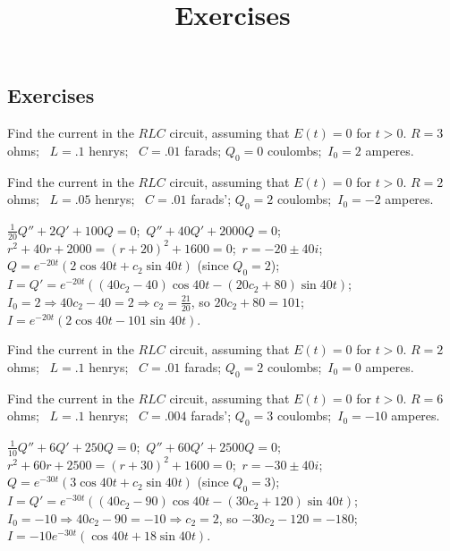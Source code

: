 \documentclass{ximera}
\title{Exercises} \license{CC BY-NC-SA 4.0}
\begin{document}
\begin{abstract}
\end{abstract}
\maketitle

\begin{onlineOnly}
\section*{Exercises}
\end{onlineOnly}


\begin{problem}\label{exer:6.3.1}
Find the current in the
$RLC$ circuit, assuming that $E(t)=0$ for $t>0$.  $R=3$ ohms;  \, $L=.1$ henrys;  \, $C=.01$ farads;   $Q_0=0$
coulombs;  \,$I_0=2$ amperes.
\end{problem}

\begin{problem}\label{exer:6.3.2}
Find the current in the
$RLC$ circuit, assuming that $E(t)=0$ for $t>0$.  $R=2$ ohms;  \, $L=.05$ henrys;  \, $C=.01$ farads';  $Q_0=2$
coulombs;  \,$I_0=-2$ amperes.

\begin{solution}
    $\frac{1}{20}Q''+2Q'+100Q=0$;\, $Q''+40Q'+2000Q=0$;\,
$r^2+40r+2000=(r+20)^2+1600=0$;\,
$r=-20\pm40i$;\,
$Q=e^{-20t}(2\cos40t+c_2\sin40t)$ (since $Q_0=2$);\,
$I=Q'=e^{-20t}\left((40c_2-40)\cos40t-(20c_2+80)\sin40t\right)$;\,
$I_0=2\Rightarrow 40c_2-40=2\Rightarrow c_2=\frac{21}{20}$,
so $20c_2+80=101$;\,
$I=e^{-20t}(2\cos40t-101\sin40t)$.
\end{solution}
\end{problem}

\begin{problem}\label{exer:6.3.3}
Find the current in the
$RLC$ circuit, assuming that $E(t)=0$ for $t>0$.  $R=2$ ohms;  \, $L=.1$ henrys;  \, $C=.01$ farads;   $Q_0=2$
coulombs;  \,$I_0=0$ amperes.
\end{problem}

\begin{problem}\label{exer:6.3.4}
Find the current in the
$RLC$ circuit, assuming that $E(t)=0$ for $t>0$.  $R=6$ ohms;  \, $L=.1$ henrys;  \, $C=.004$ farads';  $Q_0=3$
coulombs;  \,$I_0=-10$ amperes.

\begin{solution}
    $\frac{1}{10}Q''+6Q'+250Q=0$;\, $Q''+60Q'+2500Q=0$;\,
$r^2+60r+2500=(r+30)^2+1600=0$;\,
$r=-30\pm40i$;\,
$Q=e^{-30t}(3\cos40t+c_2\sin40t)$ (since $Q_0=3$);\,
$I=Q'=e^{-30t}\left((40c_2-90)\cos40t-(30c_2+120)\sin40t\right)$;\,
$I_0=-10\Rightarrow 40c_2-90=-10\Rightarrow c_2=2$,
so $-30c_2-120=-180$;\,
$I=-10e^{-30t}(\cos40t+18\sin40t)$.
\end{solution}
\end{problem}
\end{document}
